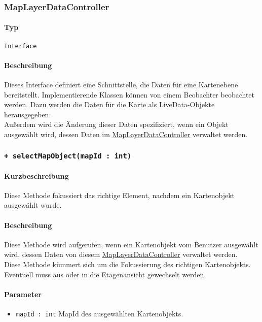 \subsubsection{MapLayerDataController}\label{App_Map_ViewModel_MapLayerDataController}
\paragraph*{Typ} 
\texttt{Interface}
\paragraph*{Beschreibung}
Dieses Interface definiert eine Schnittstelle, die Daten für eine Kartenebene bereitstellt.
Implementierende Klassen können von einem Beobachter beobachtet werden. Dazu werden die 
Daten für die Karte als LiveData-Objekte herausgegeben.\\
Außerdem wird die Änderung dieser Daten spezifiziert, wenn ein Objekt ausgewählt wird, dessen
Daten im \hyperref[App_Map_ViewModel_MapLayerDataController]{MapLayerDataController} verwaltet werden.

\subsubsection*{\texttt{+ selectMapObject(mapId : int)}}\label{App_Map_ViewModel_selectMapObject}%
\paragraph*{Kurzbeschreibung}
Diese Methode fokussiert das richtige Element, nachdem ein Kartenobjekt ausgewählt wurde.
\paragraph*{Beschreibung}
Diese Methode wird aufgerufen, wenn ein Kartenobjekt vom Benutzer ausgewählt wird, dessen 
Daten von diesem \hyperref[App_Map_ViewModel_MapLayerDataController]{MapLayerDataController} verwaltet werden.\\
Diese Methode kümmert sich um die Fokussierung des richtigen Kartenobjekts. Eventuell muss 
aus oder in die Etagenansicht gewechselt werden.
\paragraph*{Parameter}
\begin{itemize}
    \item \texttt{mapId : int} MapId des ausgewählten Kartenobjekts.
\end{itemize}
